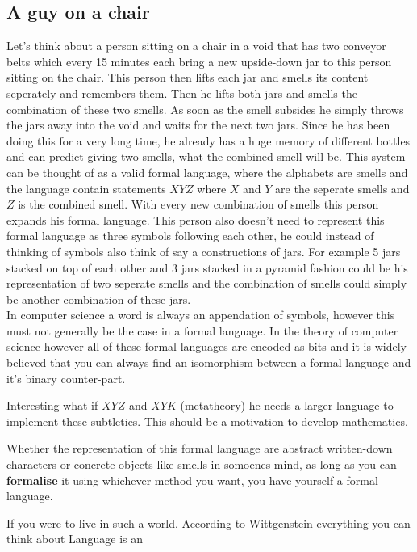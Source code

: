 \subsection{A guy on a chair}
Let's think about a person sitting on a chair in a void that has two conveyor belts which every 15 minutes each bring a new upside-down jar to this person sitting on the chair. This person then lifts each jar and smells its content seperately and remembers them. Then he lifts both jars and smells the combination of these two smells. As soon as the smell subsides he simply throws the jars away into the void and waits for the next two jars.
Since he has been doing this for a very long time, he already has a huge memory of different bottles and can predict giving two smells, what the combined smell will be.
This system can be thought of as a valid formal language, where the alphabets are smells and the language contain statements $XYZ$ where $X$ and $Y$ are the seperate smells and $Z$ is the combined smell. With every new combination of smells this person expands his formal language. 
This person also doesn't need to represent this formal language as three symbols following each other, he could instead of thinking of symbols also think of say a constructions of jars. For example 5 jars stacked on top of each other and 3 jars stacked in a pyramid fashion could be his representation of two seperate smells and the combination of smells could simply be another combination of these jars. \\
In computer science a word is always an appendation of symbols, however this must not generally be the case in a formal language.
In the theory of computer science however all of these formal languages are encoded as bits and it is widely believed that you can always find an isomorphism between a formal language and it's binary counter-part.

Interesting what if $XYZ$ and $XYK$ (metatheory) he needs a larger language to implement these subtleties. This should be a motivation to develop mathematics.

Whether the representation of this formal language are abstract written-down characters or concrete objects like smells in somoenes mind, as long as you can \textbf{formalise} it using whichever method you want, you have yourself a formal language.


If you were to live in such a world.
According to Wittgenstein everything you can think about
Language is an 



